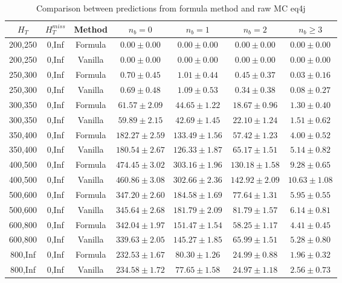 \begin{longtable}{ | c | c | c | c | c | c | c | }
\caption{Comparison between predictions from formula method and raw MC eq4j} \label{tab:eq4j} \\    \hline 
$H_{T}$ & $H_{T}^{miss}$ & Method & $n_{b} = 0$ & $n_{b} = 1$ & $n_{b} = 2$ & $n_{b} \ge 3$ \\ \hline200,250 & 0,Inf & Formula  & $     0.00 \pm  0.00 $ & $     0.00 \pm  0.00 $ & $     0.00 \pm  0.00 $ & $     0.00 \pm  0.00 $  \\  
200,250 & 0,Inf & Vanilla  & $     0.00 \pm  0.00 $ & $     0.00 \pm  0.00 $ & $     0.00 \pm  0.00 $ & $     0.00 \pm  0.00 $  \\ \hline 
250,300 & 0,Inf & Formula  & $     0.70 \pm  0.45 $ & $     1.01 \pm  0.44 $ & $     0.45 \pm  0.37 $ & $     0.03 \pm  0.16 $  \\  
250,300 & 0,Inf & Vanilla  & $     0.69 \pm  0.48 $ & $     1.09 \pm  0.53 $ & $     0.34 \pm  0.38 $ & $     0.08 \pm  0.27 $  \\ \hline 
300,350 & 0,Inf & Formula  & $    61.57 \pm  2.09 $ & $    44.65 \pm  1.22 $ & $    18.67 \pm  0.96 $ & $     1.30 \pm  0.40 $  \\  
300,350 & 0,Inf & Vanilla  & $    59.89 \pm  2.15 $ & $    42.69 \pm  1.45 $ & $    22.10 \pm  1.24 $ & $     1.51 \pm  0.62 $  \\ \hline 
350,400 & 0,Inf & Formula  & $   182.27 \pm  2.59 $ & $   133.49 \pm  1.56 $ & $    57.42 \pm  1.23 $ & $     4.00 \pm  0.52 $  \\  
350,400 & 0,Inf & Vanilla  & $   180.54 \pm  2.67 $ & $   126.33 \pm  1.87 $ & $    65.17 \pm  1.51 $ & $     5.14 \pm  0.82 $  \\ \hline 
400,500 & 0,Inf & Formula  & $   474.45 \pm  3.02 $ & $   303.16 \pm  1.96 $ & $   130.18 \pm  1.58 $ & $     9.28 \pm  0.65 $  \\  
400,500 & 0,Inf & Vanilla  & $   460.86 \pm  3.08 $ & $   302.66 \pm  2.36 $ & $   142.92 \pm  2.09 $ & $    10.63 \pm  1.08 $  \\ \hline 
500,600 & 0,Inf & Formula  & $   347.20 \pm  2.60 $ & $   184.58 \pm  1.69 $ & $    77.64 \pm  1.31 $ & $     5.95 \pm  0.55 $  \\  
500,600 & 0,Inf & Vanilla  & $   345.64 \pm  2.68 $ & $   181.79 \pm  2.09 $ & $    81.79 \pm  1.57 $ & $     6.14 \pm  0.81 $  \\ \hline 
600,800 & 0,Inf & Formula  & $   342.04 \pm  1.97 $ & $   151.47 \pm  1.54 $ & $    58.25 \pm  1.17 $ & $     4.41 \pm  0.45 $  \\  
600,800 & 0,Inf & Vanilla  & $   339.63 \pm  2.05 $ & $   145.27 \pm  1.85 $ & $    65.99 \pm  1.51 $ & $     5.28 \pm  0.80 $  \\ \hline 
800,Inf & 0,Inf & Formula  & $   232.53 \pm  1.67 $ & $    80.30 \pm  1.26 $ & $    24.99 \pm  0.88 $ & $     1.96 \pm  0.32 $  \\  
800,Inf & 0,Inf & Vanilla  & $   234.58 \pm  1.72 $ & $    77.65 \pm  1.58 $ & $    24.97 \pm  1.18 $ & $     2.56 \pm  0.73 $  \\ \hline 
    \hline 
    \hline 
\end{longtable}
